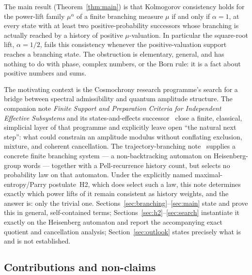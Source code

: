 \documentclass[11pt,a4paper]{article}
\theoremstyle{definition}
\theoremstyle{remark}
\begin{document}
The main result (Theorem~\ref{thm:main}) is that Kolmogorov consistency holds for the
power-lift family $\mu^\alpha$ of a finite branching measure $\mu$ if and only if
$\alpha=1$, at every state with at least two positive-probability successors whose
branching is actually reached by a history of positive $\mu$-valuation. In particular
the square-root lift, $\alpha=1/2$, fails this consistency whenever the
positive-valuation support reaches a branching state. The obstruction is elementary,
general, and has nothing to do with phase, complex numbers, or the Born rule: it is a
fact about positive numbers and sums.

The motivating context is the Cosmochrony research programme's search for a bridge
between spectral admissibility and quantum amplitude structure. The companion note
\emph{Finite Support and Preparation Criteria for Independent Effective Subsystems}
and its states-and-effects successor~\cite{Beau2026esub,Beau2026steft} close a finite,
classical, simplicial layer of that programme and explicitly leave open ``the natural
next step'': what could constrain an amplitude modulus without conflating exclusion,
mixture, and coherent cancellation. The trajectory-branching
note~\cite{Beau2026tb} supplies a concrete finite branching system --- a non-backtracking
automaton on Heisenberg-group words --- together with a Pell-recurrence history count,
but selects no probability law on that automaton. Under the explicitly named
maximal-entropy/Parry postulate~\textup{H2}, which does select such a law, this note
determines exactly which power lifts of it remain consistent as history weights, and the
answer is: only the trivial one. Sections~\ref{sec:branching}--\ref{sec:main} state and
prove this in general, self-contained terms; Sections~\ref{sec:h2}--\ref{sec:search}
instantiate it exactly on the Heisenberg automaton and report the accompanying exact
quotient and cancellation analysis; Section~\ref{sec:outlook} states precisely what is
and is not established.

\subsection{Contributions and non-claims}
\label{sec:claims}
\end{document}
